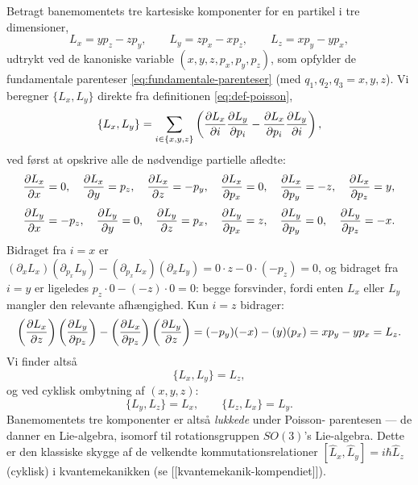 \begin{eksempel}
Betragt banemomentets tre kartesiske komponenter for en partikel i tre
dimensioner,
\begin{equation}
  L_x = yp_z - zp_y, \qquad L_y = zp_x - xp_z, \qquad L_z = xp_y - yp_x,
\end{equation}
udtrykt ved de kanoniske variable $(x,y,z,p_x,p_y,p_z)$, som opfylder
de fundamentale parenteser \eqref{eq:fundamentale-parenteser} (med
$q_1,q_2,q_3=x,y,z$). Vi beregner $\{L_x,L_y\}$ direkte fra
definitionen \eqref{eq:def-poisson},
\begin{equation}
  \{L_x,L_y\} = \sum_{i\in\{x,y,z\}}\left(\pdv{L_x}{i}\pdv{L_y}{p_i} - \pdv{L_x}{p_i}\pdv{L_y}{i}\right),
\end{equation}
ved først at opskrive alle de nødvendige partielle afledte:
\begin{equation}
  \pdv{L_x}{x}=0,\quad \pdv{L_x}{y}=p_z,\quad \pdv{L_x}{z}=-p_y,\quad
  \pdv{L_x}{p_x}=0,\quad \pdv{L_x}{p_y}=-z,\quad \pdv{L_x}{p_z}=y,
\end{equation}
\begin{equation}
  \pdv{L_y}{x}=-p_z,\quad \pdv{L_y}{y}=0,\quad \pdv{L_y}{z}=p_x,\quad
  \pdv{L_y}{p_x}=z,\quad \pdv{L_y}{p_y}=0,\quad \pdv{L_y}{p_z}=-x.
\end{equation}
Bidraget fra $i=x$ er $\left(\partial_xL_x\right)\left(\partial_{p_x}L_y\right)-\left(\partial_{p_x}L_x\right)\left(\partial_xL_y\right)=0\cdot z-0\cdot(-p_z)=0$,
og bidraget fra $i=y$ er ligeledes $p_z\cdot 0-(-z)\cdot 0=0$: begge
forsvinder, fordi enten $L_x$ eller $L_y$ mangler den relevante
afhængighed. Kun $i=z$ bidrager:
\begin{equation}
  \left(\pdv{L_x}{z}\right)\left(\pdv{L_y}{p_z}\right) - \left(\pdv{L_x}{p_z}\right)\left(\pdv{L_y}{z}\right)
  = (-p_y)(-x) - (y)(p_x) = xp_y - yp_x = L_z.
\end{equation}
Vi finder altså
\begin{equation}
  \boxed{\{L_x,L_y\} = L_z,}
  \label{eq:Lx-Ly}
\end{equation}
og ved cyklisk ombytning af $(x,y,z)$:
\begin{equation}
  \{L_y,L_z\} = L_x, \qquad \{L_z,L_x\} = L_y.
\end{equation}
Banemomentets tre komponenter er altså \emph{lukkede} under Poisson-
parentesen — de danner en Lie-algebra, isomorf til rotationsgruppen
$SO(3)$'s Lie-algebra. Dette er den klassiske skygge af de velkendte
kommutationsrelationer $[\hat L_x,\hat L_y]=i\hbar\hat L_z$ (cyklisk) i
kvantemekanikken (se [[kvantemekanik-kompendiet]]).
\end{eksempel}

